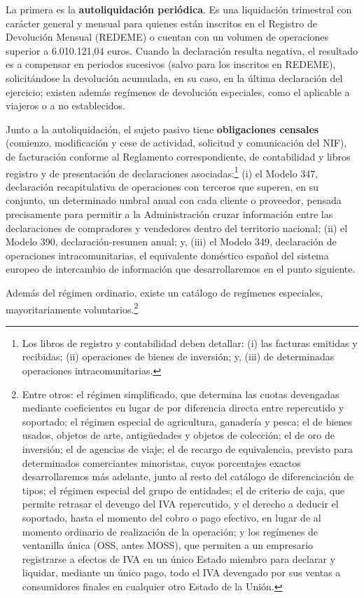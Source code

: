 \documentclass[10pt,a4paper]{article}
\begin{document}
La primera es la \textbf{autoliquidación periódica}. Es una liquidación trimestral con carácter general y mensual para quienes están inscritos en el Registro de Devolución Mensual (REDEME) o cuentan con un volumen de operaciones superior a 6.010.121,04 euros. Cuando la declaración resulta negativa, el resultado es a compensar en periodos sucesivos (salvo para los inscritos en REDEME), solicitándose la devolución acumulada, en su caso, en la última declaración del ejercicio; existen además regímenes de devolución especiales, como el aplicable a viajeros o a no establecidos.

Junto a la autoliquidación, el sujeto pasivo tiene \textbf{obligaciones censales} (comienzo, modificación y cese de actividad, solicitud y comunicación del NIF), de facturación conforme al Reglamento correspondiente, de contabilidad y libros registro y de presentación de declaraciones asociadas:\footnote{%
    Los libros de registro y contabilidad deben detallar: (i) las facturas emitidas y recibidas; (ii) operaciones de bienes de inversión; y, (iii) de determinadas operaciones intracomunitarias.
} (i) el Modelo 347, declaración recapitulativa de operaciones con terceros que superen, en su conjunto, un determinado umbral anual con cada cliente o proveedor, pensada precisamente para permitir a la Administración cruzar información entre las declaraciones de compradores y vendedores dentro del territorio nacional; (ii) el Modelo 390, declaración-resumen anual; y, (iii) el Modelo 349, declaración de operaciones intracomunitarias, el equivalente doméstico español del sistema europeo de intercambio de información que desarrollaremos en el punto siguiente.

Además del régimen ordinario, existe un catálogo de regímenes especiales, mayoritariamente voluntarios.\footnote{%
    Entre otros: el régimen simplificado, que determina las cuotas devengadas mediante coeficientes en lugar de por diferencia directa entre repercutido y soportado; el régimen especial de agricultura, ganadería y pesca; el de bienes usados, objetos de arte, antigüedades y objetos de colección; el de oro de inversión; el de agencias de viaje; el de recargo de equivalencia, previsto para determinados comerciantes minoristas, cuyos porcentajes exactos desarrollaremos más adelante, junto al resto del catálogo de diferenciación de tipos; el régimen especial del grupo de entidades; el de criterio de caja, que permite retrasar el devengo del IVA repercutido, y el derecho a deducir el soportado, hasta el momento del cobro o pago efectivo, en lugar de al momento ordinario de realización de la operación; y los regímenes de ventanilla única (OSS, antes MOSS), que permiten a un empresario registrarse a efectos de IVA en un único Estado miembro para declarar y liquidar, mediante un único pago, todo el IVA devengado por sus ventas a consumidores finales en cualquier otro Estado de la Unión.
}
\end{document}

